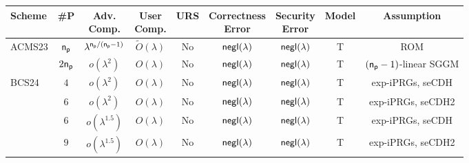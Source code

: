 \begin{table}[h]
\centering
\scriptsize
\setlength{\tabcolsep}{4pt}
\begin{tabular}{|l|c|c|c|c|c|c|c|c|}
\hline
\textbf{Scheme} 
& \textbf{\#P} 
& \shortstack{\textbf{Adv.}\\\textbf{Comp.}}
& \shortstack{\textbf{User}\\\textbf{Comp.}}
& \textbf{URS} 
& \shortstack{\textbf{Correctness}\\\textbf{Error}}
& \shortstack{\textbf{Security}\\\textbf{Error}}
& \textbf{Model} 
& \textbf{Assumption} \\
\hline

\multirow{2}{*}{ACMS23\cite{EC:ACMS23}}
& $\mathsf{n_p}$ 
& $\lambda^{\mathsf{n_p}/(\mathsf{n_p}-1)}$
& $\tilde{O}(\lambda)$  
& No  
& $\mathsf{negl}(\lambda)$ 
& $\mathsf{negl}(\lambda)$
& T 
& ROM \\ 
\cline{2-9}

& $2\mathsf{n_p}$ 
& $o(\lambda^2)$ 
& $O(\lambda)$ 
& No 
& $\mathsf{negl}(\lambda)$ 
& $\mathsf{negl}(\lambda)$ 
& T
& $(\mathsf{n_p}-1)$-linear SGGM \\ 
\hline

\multirow{5}{*}{BCS24\cite{C:BauCouSad24}}
& $4$ 
& $o(\lambda^2)$ 
& $O(\lambda)$ 
& No 
& $\mathsf{negl}(\lambda)$ 
& $\mathsf{negl}(\lambda)$ 
& T 
& exp-iPRGs, seCDH \\ 
\cline{2-9}

& $6$ 
& $o(\lambda^2)$ 
& $O(\lambda)$ 
& No 
& $\mathsf{negl}(\lambda)$ 
& $\mathsf{negl}(\lambda)$ 
& T 
& exp-iPRGs, seCDH2 \\ 
\cline{2-9}

& $6$ 
& $o(\lambda^{1.5})$ 
& $O(\lambda)$ 
& No 
& $\mathsf{negl}(\lambda)$ 
& $\mathsf{negl}(\lambda)$ 
& T 
& exp-iPRGs, seCDH \\ 
\cline{2-9}

& $9$ 
& $o(\lambda^{1.5})$ 
& $O(\lambda)$ 
& No 
& $\mathsf{negl}(\lambda)$ 
& $\mathsf{negl}(\lambda)$ 
& T 
& exp-iPRGs, seCDH2 \\ 
\cline{2-9}


\end{tabular}
\end{table}
